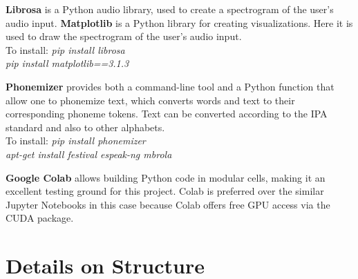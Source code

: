 \documentclass[12pt, letterpaper]{article}
\begin{document}
\textbf{Librosa} is a Python audio library, used to create a spectrogram of the user's audio input. 
\textbf{Matplotlib} is a Python library for creating visualizations. Here it is used to draw the spectrogram of the user's audio input.
\\To install: \textit{pip install librosa}
\\\hspace*{19mm} \textit{pip install matplotlib==3.1.3}

\textbf{Phonemizer} provides both a command-line tool and a Python function that allow one to phonemize text, which converts words and text to their corresponding phoneme tokens. Text can be converted according to the IPA standard and also to other alphabets.
\\To install: \textit{pip install phonemizer}
\\\hspace*{19mm} \textit{apt-get install festival espeak-ng mbrola}

\textbf{Google Colab} allows building Python code in modular cells, making it an excellent testing ground for this project. Colab is preferred over the similar Jupyter Notebooks in this case because Colab offers free GPU access via the CUDA package.
\newpage%


\section*{Details on Structure}
\end{document}
